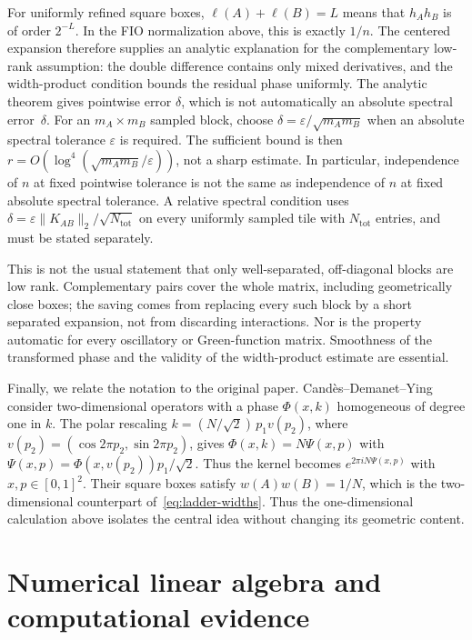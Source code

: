 \documentclass[11pt,a4paper]{article}
\begin{document}
For uniformly refined square boxes, $\ell(A)+\ell(B)=L$ means that $h_Ah_B$ is of order $2^{-L}$. In the FIO normalization above, this is exactly $1/n$. The centered expansion therefore supplies an analytic explanation for the complementary low-rank assumption: the double difference contains only mixed derivatives, and the width-product condition bounds the residual phase uniformly. The analytic theorem gives pointwise error $\delta$, which is not automatically an absolute spectral error~$\delta$. For an $m_A\times m_B$ sampled block, choose $\delta=\varepsilon/\sqrt{m_Am_B}$ when an absolute spectral tolerance $\varepsilon$ is required. The sufficient bound is then $r=O(\log^4(\sqrt{m_Am_B}/\varepsilon))$, not a sharp estimate. In particular, independence of $n$ at fixed pointwise tolerance is not the same as independence of $n$ at fixed absolute spectral tolerance. A relative spectral condition uses $\delta=\varepsilon\|K_{AB}\|_2/\sqrt{N_{\mathrm{tot}}}$ on every uniformly sampled tile with $N_{\mathrm{tot}}$ entries, and must be stated separately.

This is not the usual statement that only well-separated, off-diagonal blocks are low rank. Complementary pairs cover the whole matrix, including geometrically close boxes; the saving comes from replacing every such block by a short separated expansion, not from discarding interactions. Nor is the property automatic for every oscillatory or Green-function matrix. Smoothness of the transformed phase and the validity of the width-product estimate are essential.

Finally, we relate the notation to the original paper. Cand\`{e}s--Demanet--Ying consider two-dimensional operators with a phase $\Phi(x,k)$ homogeneous of degree one in $k$. The polar rescaling $k=(N/\sqrt2)\,p_1v(p_2)$, where $v(p_2)=(\cos 2\pi p_2,\sin 2\pi p_2)$, gives $\Phi(x,k)=N\Psi(x,p)$ with $\Psi(x,p)=\Phi(x,v(p_2))p_1/\sqrt2$. Thus the kernel becomes $e^{2\pi i N\Psi(x,p)}$ with $x,p\in[0,1]^2$. Their square boxes satisfy $w(A)w(B)=1/N$, which is the two-dimensional counterpart of~\eqref{eq:ladder-widths}. Thus the one-dimensional calculation above isolates the central idea without changing its geometric content.

\section{Numerical linear algebra and computational evidence}
\label{sec:numerical-evidence}
\end{document}
